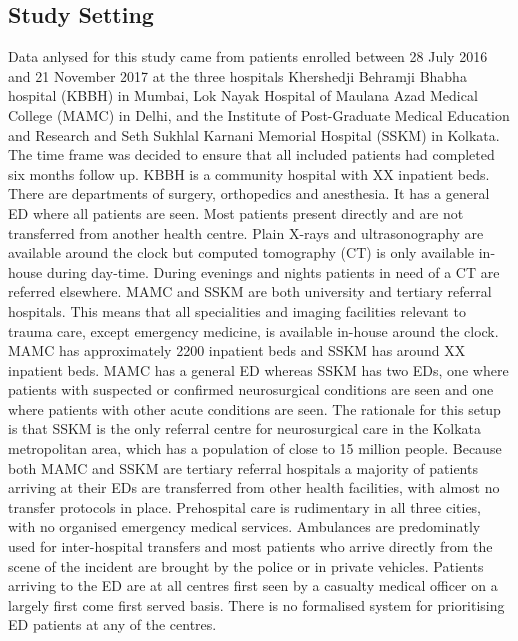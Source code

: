 \documentclass[10pt,letterpaper]{article}\usepackage[]{graphicx}\usepackage[]{color}
\begin{document}
\subsection*{Study Setting}
Data anlysed for this study came from patients enrolled between 28 July 2016 and
21 November 2017 at the three hospitals Khershedji Behramji Bhabha hospital
(KBBH) in Mumbai, Lok Nayak Hospital of Maulana Azad Medical College (MAMC) in
Delhi, and the Institute of Post-Graduate Medical Education and Research and
Seth Sukhlal Karnani Memorial Hospital (SSKM) in Kolkata. The time frame was
decided to ensure that all included patients had completed six months follow
up. KBBH is a community hospital with XX inpatient beds. There are departments
of surgery, orthopedics and anesthesia. It has a general ED where all patients
are seen. Most patients present directly and are not transferred from another
health centre. Plain X-rays and ultrasonography are available around the clock
but computed tomography (CT) is only available in-house during day-time. During
evenings and nights patients in need of a CT are referred elsewhere. MAMC and
SSKM are both university and tertiary referral hospitals. This means that all
specialities and imaging facilities relevant to trauma care, except emergency
medicine, is available in-house around the clock. MAMC has approximately 2200
inpatient beds and SSKM has around XX inpatient beds. MAMC has a general ED
whereas SSKM has two EDs, one where patients with suspected or confirmed
neurosurgical conditions are seen and one where patients with other acute
conditions are seen. The rationale for this setup is that SSKM is the only
referral centre for neurosurgical care in the Kolkata metropolitan area, which
has a population of close to 15 million people. Because both MAMC and SSKM are
tertiary referral hospitals a majority of patients arriving at their EDs are
transferred from other health facilities, with almost no transfer protocols in
place. Prehospital care is rudimentary in all three cities, with no organised
emergency medical services. Ambulances are predominatly used for inter-hospital
transfers and most patients who arrive directly from the scene of the incident
are brought by the police or in private vehicles. Patients arriving to the ED
are at all centres first seen by a casualty medical officer on a largely first
come first served basis. There is no formalised system for prioritising ED
patients at any of the centres.
\end{document}
